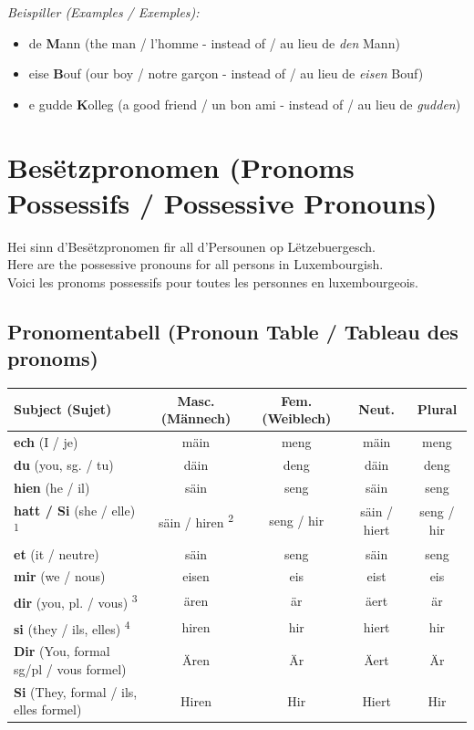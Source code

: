 \textit{Beispiller (Examples / Exemples):}
\begin{itemize}
    \item de \textbf{M}ann (the man / l'homme - instead of / au lieu de \textit{den} Mann)
    \item eise \textbf{B}ouf (our boy / notre garçon - instead of / au lieu de \textit{eisen} Bouf)
    \item e gudde \textbf{K}olleg (a good friend / un bon ami - instead of / au lieu de \textit{gudden})
\end{itemize}


\section{Besëtzpronomen (Pronoms Possessifs / Possessive Pronouns)}

Hei sinn d'Besëtzpronomen fir all d'Persounen op Lëtzebuergesch. \\
Here are the possessive pronouns for all persons in Luxembourgish. \\
Voici les pronoms possessifs pour toutes les personnes en luxembourgeois.

\subsection*{Pronomentabell (Pronoun Table / Tableau des pronoms)}

\begin{table}[h!]
    \centering
    \renewcommand{\arraystretch}{1.5}
    \begin{tabular}{|l|c|c|c|c|}
    \hline
    \textbf{Subject (Sujet)} & \textbf{Masc. (Männech)} & \textbf{Fem. (Weiblech)} & \textbf{Neut.} & \textbf{Plural} \\
    \hline
    \textbf{ech} (I / je) & mäin & meng & mäin & meng \\
    \hline
    \textbf{du} (you, sg. / tu) & däin & deng & däin & deng \\
    \hline
    \textbf{hien} (he / il) & säin & seng & säin & seng \\
    \hline
    \textbf{hatt / Si} (she / elle) \textsuperscript{1} & säin / hiren \textsuperscript{2} & seng / hir & säin / hiert & seng / hir \\
    \hline
    \textbf{et} (it / neutre) & säin & seng & säin & seng \\
    \hline
    \textbf{mir} (we / nous) & eisen & eis & eist & eis \\
    \hline
    \textbf{dir} (you, pl. / vous) \textsuperscript{3} & ären & är & äert & är \\
    \hline
    \textbf{si} (they / ils, elles) \textsuperscript{4} & hiren & hir & hiert & hir \\
    \hline
    \textbf{Dir} (You, formal sg/pl / vous formel) & Ären & Är & Äert & Är \\
    \hline
    \textbf{Si} (They, formal / ils, elles formel) & Hiren & Hir & Hiert & Hir \\
    \hline
    \end{tabular}
\end{table}

